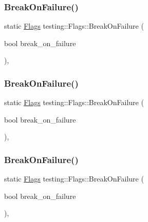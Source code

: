 \mbox{\label{structtesting_1_1_flags_a62660e44922321f7640bc951a04c2296}} 
\subsubsection{\texorpdfstring{BreakOnFailure()}{BreakOnFailure()}\hspace{0.1cm}{\footnotesize\ttfamily [1/3]}}
{\footnotesize\ttfamily static \mbox{\hyperlink{structtesting_1_1_flags}{Flags}} testing\+::\+Flags\+::\+Break\+On\+Failure (\begin{DoxyParamCaption}\item[{bool}]{break\+\_\+on\+\_\+failure }\end{DoxyParamCaption})\hspace{0.3cm}{\ttfamily [inline]}, {\ttfamily [static]}}

\mbox{\label{structtesting_1_1_flags_a62660e44922321f7640bc951a04c2296}} 
\subsubsection{\texorpdfstring{BreakOnFailure()}{BreakOnFailure()}\hspace{0.1cm}{\footnotesize\ttfamily [2/3]}}
{\footnotesize\ttfamily static \mbox{\hyperlink{structtesting_1_1_flags}{Flags}} testing\+::\+Flags\+::\+Break\+On\+Failure (\begin{DoxyParamCaption}\item[{bool}]{break\+\_\+on\+\_\+failure }\end{DoxyParamCaption})\hspace{0.3cm}{\ttfamily [inline]}, {\ttfamily [static]}}

\mbox{\label{structtesting_1_1_flags_a62660e44922321f7640bc951a04c2296}} 
\subsubsection{\texorpdfstring{BreakOnFailure()}{BreakOnFailure()}\hspace{0.1cm}{\footnotesize\ttfamily [3/3]}}
{\footnotesize\ttfamily static \mbox{\hyperlink{structtesting_1_1_flags}{Flags}} testing\+::\+Flags\+::\+Break\+On\+Failure (\begin{DoxyParamCaption}\item[{bool}]{break\+\_\+on\+\_\+failure }\end{DoxyParamCaption})\hspace{0.3cm}{\ttfamily [inline]}, {\ttfamily [static]}}

